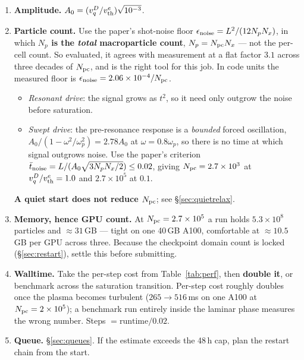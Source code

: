 \documentclass[11pt,a4paper]{article}
\newcommand{\vth}{v_{\rm th}^{e}}
\newcommand{\Npc}{N_{\rm pc}}
\begin{document}
\begin{enumerate}
  \item \textbf{Amplitude.} $A_0 = (v_q^D/\vth)\sqrt{10^{-3}}$.
  \item \textbf{Particle count.} Use the paper's shot-noise floor
        $\epsilon_{\rm noise} = L^2/(12 N_p N_x)$, in which \textbf{$N_p$ is the
        \emph{total} macroparticle count}, $N_p = \Npc N_x$ --- not the per-cell
        count. So evaluated, it agrees with measurement at a flat factor $3.1$ across
        three decades of $\Npc$, and is the right tool for this job. In code units the
        measured floor is $\epsilon_{\rm noise} = 2.06\times10^{-4}/\Npc$.
        \begin{itemize}[nosep]
          \item \emph{Resonant drive}: the signal grows as $t^2$, so it need only
                outgrow the noise before saturation.
          \item \emph{Swept drive}: the pre-resonance response is a \emph{bounded}
                forced oscillation, $A_0/(1-\omega^2/\omega_p^2) = 2.78A_0$ at
                $\omega = 0.8\omega_p$, so there is no time at which signal outgrows
                noise. Use the paper's criterion
                $\bar t_{\rm noise} = L/(A_0\sqrt{3N_pN_x/2}) \le 0.02$, giving
                $\Npc = 2.7\times10^3$ at $v_q^D/\vth = 1.0$ and $2.7\times10^5$
                at $0.1$.
        \end{itemize}
        \textbf{A quiet start does not reduce $\Npc$}; see \S\ref{sec:quietrelax}.
  \item \textbf{Memory, hence GPU count.} At $\Npc = 2.7\times10^5$ a run holds
        $5.3\times10^8$ particles and ${\approx}31$\,GB --- tight on one 40\,GB A100,
        comfortable at ${\approx}10.5$\,GB per GPU across three. Because the checkpoint
        domain count is locked (\S\ref{sec:restart}), settle this before submitting.
  \item \textbf{Walltime.} Take the per-step cost from Table~\ref{tab:perf}, then
        \textbf{double it}, or benchmark across the saturation transition. Per-step
        cost roughly doubles once the plasma becomes turbulent
        ($265 \to 516$\,ms on one A100 at $\Npc = 2\times10^5$); a benchmark run
        entirely inside the laminar phase measures the wrong number. Steps
        $= \text{runtime}/0.02$.
  \item \textbf{Queue.} \S\ref{sec:queues}. If the estimate exceeds the 48\,h cap,
        plan the restart chain from the start.
\end{enumerate}
\end{document}
